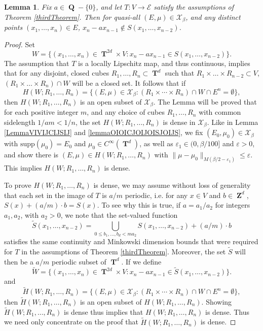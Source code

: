 \documentclass[dvipsnames,letterpaper,12pt]{article}
\numberwithin{equation}{section}
\DeclareMathOperator{\ZZ}{\mathbf{Z}}
\DeclareMathOperator{\QQ}{\mathbf{Q}}
\DeclareMathOperator{\TT}{\mathbf{T}}
\newtheorem{lemma}[theorem]{Lemma}
\numberwithin{theorem}{section}
\begin{document}
\begin{lemma}
    Fix $a \in \QQ - \{ 0 \}$, and let $T: V \to \mathcal{E}$ satisfy the assumptions of Theorem \ref{thirdTheorem}. Then for quasi-all $(E,\mu) \in \mathcal{X}_\beta$, and any distinct points $(x_1,\dots,x_n) \in E$, $x_n - ax_{n-1} \not \in S(x_1,\dots,x_{n-2})$.   
\end{lemma}
\begin{proof}
    Set
    \[ W = \{ (x_1,\dots,x_n) \in \TT^{2d} \times V : x_n - ax_{n-1} \in S(x_1,\dots,x_{n-2}) \}. \]
    The assumption that $T$ is a locally Lipschitz map, and thus continuous, implies that for any disjoint, closed cubes $R_1,\dots,R_n \subset \TT^d$ such that $R_1 \times \dots \times R_{n-2} \subset V$, $(R_1 \times \dots \times R_n) \cap W$ will be a closed set. It follows that if
    \[ H(W;R_1,\dots,R_n) = \{ (E,\mu) \in \mathcal{X}_\beta: (R_1 \times \cdots \times R_n) \cap W \cap E^n = \emptyset \}, \]
    then $H(W;R_1,\dots,R_n)$ is an open subset of $\mathcal{X}_\beta$. The Lemma will be proved that for each positive integer $m$, and any choice of cubes $R_1,\dots,R_n$ with common sidelength $1/am < 1/n$, the set $H(W;R_1,\dots,R_n)$ is dense in $\mathcal{X}_\beta$. Like in Lemma \ref{LemmaVIVIJCIJSIJ} and \ref{lemmaOIOICJOIJOISJOIJS}, we fix $(E_0,\mu_0) \in \mathcal{X}_\beta$ with $\text{supp}(\mu_0) = E_0$ and $\mu_0 \in C^\infty(\TT^d)$, as well as $\varepsilon_1 \in (0,\beta/100]$ and $\varepsilon > 0$, and show there is $(E,\mu) \in H(W;R_1,\dots,R_n)$ with $\| \mu - \mu_0 \|_{M(\beta/2 - \varepsilon_1)} \leq \varepsilon$. This implies $H(W;R_1,\dots,R_n)$ is dense.

    To prove $H(W;R_1,\dots,R_n)$ is dense, we may assume without loss of generality that each set in the image of $T$ is $a/m$ periodic, i.e. for any $x \in V$ and $b \in \ZZ^d$, $S(x) + (a/m) \cdot b = S(x)$. To see why this is true, if $a = a_1/a_2$ for integers $a_1,a_2$, with $a_2 > 0$, we note that the set-valued function
    \[ \tilde{S}(x_1,\dots,x_{n-2}) = \bigcup_{0 \leq b_1,\dots,b_d < m a_2} S(x_1,\dots,x_{n-2}) + (a/m) \cdot b \]
    satisfies the same continuity and Minkowski dimension bounds that were required for $T$ in the assumptions of Theorem \ref{thirdTheorem}. Moreover, the set $\tilde{S}$ will then be a $a/m$ periodic subset of $\TT^d$. If we define
    \[ \tilde{W} = \{ (x_1,\dots,x_n) \in \TT^{2d} \times V : x_n - ax_{n-1} \in \tilde{S}(x_1,\dots,x_{n-2}) \}. \]
    and
    \[ \tilde{H}(W;R_1,\dots,R_n) = \{ (E,\mu) \in \mathcal{X}_\beta: (R_1 \times \cdots \times R_n) \cap W \cap E^n = \emptyset \}, \]
    then $\tilde{H}(W;R_1,\dots,R_n)$ is an open subset of $H(W;R_1,\dots,R_n)$. Showing $\tilde{H}(W;R_1,\dots,R_n)$ is dense thus implies that $H(W;R_1,\dots,R_n)$ is dense. Thus we need only concentrate on the proof that $\tilde{H}(W;R_1,\dots,R_n)$ is dense.


\end{proof}
\end{document}
